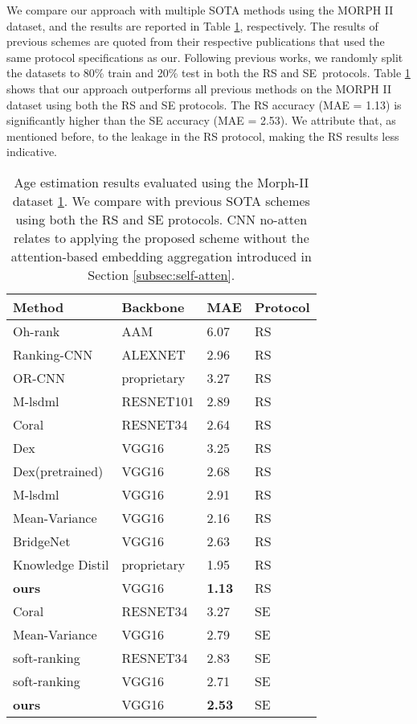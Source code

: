 \documentclass[10pt,twocolumn,letterpaper]{article}
\begin{document}
We compare our approach with multiple SOTA methods using the MORPH II
dataset, and the results are reported in Table \ref{table:Morph-II},
respectively. The results of previous schemes are quoted from their
respective publications that used the same protocol specifications as our.
Following previous works, we randomly split the datasets to 80\% train and
20\% test in both the RS and SE\ protocols. Table \ref{table:Morph-II} shows
that our approach outperforms all previous methods on the MORPH II dataset
using both the RS and SE protocols. The RS accuracy (MAE = 1.13) is
significantly higher than the SE accuracy (MAE = 2.53). We attribute that,
as mentioned before, to the leakage in the RS protocol, making the RS
results less indicative.
\begin{table}[th]
\begin{center}
\centering \begin{tabular}{l|l|l|l}
\hline
Method & Backbone & MAE & Protocol \\ \hline\hline
Oh-rank\cite{chang2011ordinal} & AAM & 6.07 & RS \\
Ranking-CNN\cite{8099569} & ALEXNET & 2.96 & RS \\
OR-CNN\cite{7780901} & proprietary & 3.27 & RS \\
M-lsdml\cite{8017500} & RESNET101 & 2.89 & RS \\
Coral\cite{coral} & RESNET34 & 2.64 & RS \\
Dex\cite{7406390} & VGG16 & 3.25 & RS \\
Dex(pretrained)\cite{7406390} & VGG16 & 2.68 & RS \\
M-lsdml\cite{8017500} & VGG16 & 2.91 & RS \\
Mean-Variance\cite{Mean-Variance} & VGG16 & 2.16 & RS \\
BridgeNet\cite{8954134} & VGG16 & 2.63 & RS \\
Knowledge Distil\cite{Dark_Knowledge} & proprietary & 1.95 & RS \\
\textbf{ours} & VGG16 & \textbf{1.13} & RS \\ \hline
Coral\cite{coral} & RESNET34 & 3.27 & SE \\
Mean-Variance\cite{Mean-Variance} & VGG16 & 2.79 & SE \\
soft-ranking\cite{9145576} & RESNET34 & 2.83 & SE \\
soft-ranking\cite{9145576} & VGG16 & 2.71 & SE \\
\textbf{ours} & VGG16 & \textbf{2.53} & SE \\ \hline
\end{tabular}\end{center}
\caption{Age estimation results evaluated using the Morph-II dataset \protect
\ref{table:Morph-II}. We compare with previous SOTA schemes using both the
RS and SE protocols. CNN no-atten relates to applying the proposed scheme
without the attention-based embedding aggregation introduced in Section
\protect\ref{subsec:self-atten}.}
\label{table:Morph-II}
\end{table}
\end{document}
